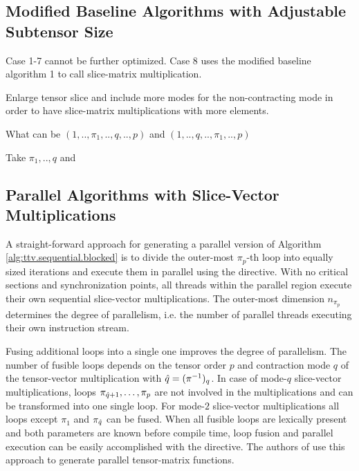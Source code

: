 \subsection{Modified Baseline Algorithms with Adjustable Subtensor Size}
\label{sec:design:blas.based.algorithm}

Case 1-7 cannot be further optimized.
Case 8 uses the modified baseline algorithm 1 to call slice-matrix multiplication.

Enlarge tensor slice and include more modes for the non-contracting mode in order to have slice-matrix multiplications with more elements.

What can be $(1,..,\pi_1,..,q,..,p)$ and $(1,..,q,..,\pi_1,..,p)$

Take $\pi_1,..,q$ and 


\subsection{Parallel Algorithms with Slice-Vector Multiplications}
\label{subsec:parallel.multi-loops}
A straight-forward approach for generating a parallel version of Algorithm \ref{alg:ttv.sequential.blocked} is to divide the outer-most $\pi_p$-th loop into equally sized iterations and execute them in parallel using the    directive\cite{bassoy:2018:fast}.
With no critical sections and synchronization points, all threads within the parallel region execute their own sequential slice-vector multiplications.
The outer-most dimension $n_{\pi_p}$ determines the degree of parallelism, i.e. the number of parallel threads executing their own instruction stream.


Fusing additional loops into a single one improves the degree of parallelism.
The number of fusible loops depends on the tensor order $p$ and contraction mode $q$ of the tensor-vector multiplication with $\hat{q} = (\pi^{-1})_q$.
In case of mode-$q$ slice-vector multiplications, loops $\pi_{\hat{q}+1}, \dots, \pi_{p}$ are not involved in the multiplications and can be transformed into one single loop.
For mode-$2$ slice-vector multiplications all loops except $\pi_1$ and $\pi_{\hat{q}}$ can be fused.
When all fusible loops are lexically present and both parameters are known before compile time, loop fusion and parallel execution can be easily accomplished with the   directive.
The authors of \cite{li:2015:input} use this approach to generate parallel tensor-matrix functions.

